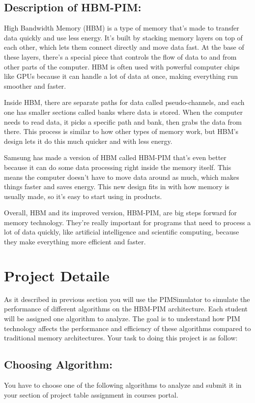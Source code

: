 \documentclass[12pt]{article}
\begin{document}
\subsection{Description of HBM-PIM:}
High Bandwidth Memory (HBM) is a type of memory that's made to transfer data quickly and use less energy. It's built by stacking memory layers on top of each other, which lets them connect directly and move data fast. At the base of these layers, there's a special piece that controls the flow of data to and from other parts of the computer. HBM is often used with powerful computer chips like GPUs because it can handle a lot of data at once, making everything run smoother and faster.

Inside HBM, there are separate paths for data called pseudo-channels, and each one has smaller sections called banks where data is stored. When the computer needs to read data, it picks a specific path and bank, then grabs the data from there. This process is similar to how other types of memory work, but HBM's design lets it do this much quicker and with less energy.

Samsung has made a version of HBM called HBM-PIM that's even better because it can do some data processing right inside the memory itself. This means the computer doesn't have to move data around as much, which makes things faster and saves energy. This new design fits in with how memory is usually made, so it's easy to start using in products.

Overall, HBM and its improved version, HBM-PIM, are big steps forward for memory technology. They're really important for programs that need to process a lot of data quickly, like artificial intelligence and scientific computing, because they make everything more efficient and faster.



\section{Project Detaile}
As it described in previous section you will use the PIMSimulator to simulate the performance of different algorithms on the HBM-PIM architecture. Each student will be assigned one algorithm to analyze. The goal is to understand how PIM technology affects the performance and efficiency of these algorithms compared to traditional memory architectures. Your task to doing this project is as follow:

\subsection{Choosing Algorithm:}
You have to choose one of the following algorithms to analyze and submit it in your section of project table assignment in courses portal.
\end{document}
